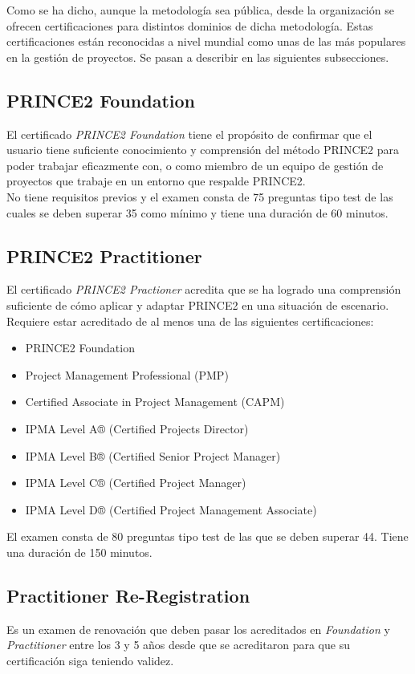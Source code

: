 Como se ha dicho, aunque la metodología sea pública, desde la organización se ofrecen certificaciones para distintos dominios de dicha metodología. Estas certificaciones están reconocidas a nivel mundial como unas de las más populares en la gestión de proyectos. Se pasan a describir en las siguientes subsecciones.


\subsection{PRINCE2 Foundation}
El certificado \emph{PRINCE2 Foundation} tiene el propósito de confirmar que el usuario tiene suficiente conocimiento y comprensión del método PRINCE2 para poder trabajar eficazmente con, o como miembro de un equipo de gestión de proyectos que trabaje en un entorno que respalde PRINCE2.\\

No tiene requisitos previos y el examen consta de 75 preguntas tipo test de las cuales se deben superar 35 como mínimo y tiene una duración de 60 minutos.

\subsection{PRINCE2 Practitioner}
El certificado \emph{PRINCE2 Practioner} acredita que se ha logrado una comprensión suficiente de cómo aplicar y adaptar PRINCE2 en una situación de escenario. Requiere estar acreditado de al menos una de las siguientes certificaciones:
\begin{itemize}
	\item PRINCE2 Foundation
	\item Project Management Professional (PMP)
	\item Certified Associate in Project Management (CAPM)
	\item IPMA Level A® (Certified Projects Director)
	\item IPMA Level B® (Certified Senior Project Manager)
	\item IPMA Level C® (Certified Project Manager)
	\item IPMA Level D® (Certified Project Management Associate) 
\end{itemize}

El examen consta de 80 preguntas tipo test de las que se deben superar 44. Tiene una duración de 150 minutos.

\subsection{Practitioner Re-Registration}
Es un examen de renovación que deben pasar los acreditados en \emph{Foundation} y \emph{Practitioner} entre los 3 y 5 años desde que se acreditaron para que su certificación siga teniendo validez.

